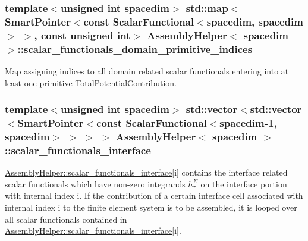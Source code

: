 \subsubsection[{\texorpdfstring{scalar\+\_\+functionals\+\_\+domain\+\_\+primitive\+\_\+indices}{scalar_functionals_domain_primitive_indices}}]{\setlength{\rightskip}{0pt plus 5cm}template$<$unsigned int spacedim$>$ std\+::map$<${\bf Smart\+Pointer}$<$const {\bf Scalar\+Functional}$<$spacedim, spacedim$>$ $>$, const unsigned int$>$ {\bf Assembly\+Helper}$<$ spacedim $>$\+::scalar\+\_\+functionals\+\_\+domain\+\_\+primitive\+\_\+indices\hspace{0.3cm}{\ttfamily [private]}}\hypertarget{class_assembly_helper_a4f08790a2235e48ce19f5d8d965a7874}{}\label{class_assembly_helper_a4f08790a2235e48ce19f5d8d965a7874}
Map assigning indices to all domain related scalar functionals entering into at least one primitive \hyperlink{class_total_potential_contribution}{Total\+Potential\+Contribution}. 
\subsubsection[{\texorpdfstring{scalar\+\_\+functionals\+\_\+interface}{scalar_functionals_interface}}]{\setlength{\rightskip}{0pt plus 5cm}template$<$unsigned int spacedim$>$ std\+::vector$<$std\+::vector$<${\bf Smart\+Pointer}$<$const {\bf Scalar\+Functional}$<$spacedim-\/1, spacedim$>$ $>$ $>$ $>$ {\bf Assembly\+Helper}$<$ spacedim $>$\+::scalar\+\_\+functionals\+\_\+interface\hspace{0.3cm}{\ttfamily [private]}}\hypertarget{class_assembly_helper_a29aa77e0e8e6b35c94966ea88840e462}{}\label{class_assembly_helper_a29aa77e0e8e6b35c94966ea88840e462}
\hyperlink{class_assembly_helper_a29aa77e0e8e6b35c94966ea88840e462}{Assembly\+Helper\+::scalar\+\_\+functionals\+\_\+interface}\mbox{[}{\ttfamily i}\mbox{]} contains the interface related scalar functionals which have non-\/zero integrands $h^\Sigma_\tau$ on the interface portion with internal index {\ttfamily i}. If the contribution of a certain interface cell associated with internal index {\ttfamily i} to the finite element system is to be assembled, it is looped over all scalar functionals contained in \hyperlink{class_assembly_helper_a29aa77e0e8e6b35c94966ea88840e462}{Assembly\+Helper\+::scalar\+\_\+functionals\+\_\+interface}\mbox{[}{\ttfamily i}\mbox{]}. 

